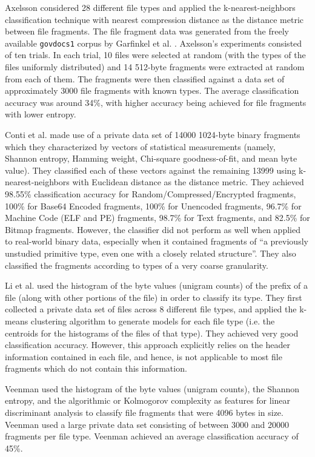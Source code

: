 \documentclass[letter,11pt]{article}
\begin{document}
Axelsson \cite{Axelsson10} considered 28 different file types and applied the k-nearest-neighbors classification technique with nearest compression distance as the distance metric between file fragments. The file fragment data was generated from the freely available \texttt{govdocs1} corpus by Garfinkel et al. \cite{Garfinkel09}. Axelsson's experiments consisted of ten trials. In each trial, 10 files were selected at random (with the types of the files uniformly distributed) and 14 512-byte fragments were extracted at random from each of them. The fragments were then classified against a data set of approximately 3000 file fragments with known types. The average classification accuracy was around 34\%, with higher accuracy being achieved for file fragments with lower entropy.

Conti et al. \cite{Conti10} made use of a private data set of 14000 1024-byte binary fragments which they characterized by vectors of statistical measurements (namely, Shannon entropy, Hamming weight, Chi-square goodness-of-fit, and mean byte value). They classified each of these vectors against the remaining 13999 using k-nearest-neighbors with Euclidean distance as the distance metric. They achieved 98.55\% classification accuracy for Random/Compressed/Encrypted fragments, 100\% for Base64 Encoded fragments, 100\% for Unencoded fragments, 96.7\% for Machine Code (ELF and PE) fragments, 98.7\% for Text fragments, and 82.5\% for Bitmap fragments. However, the classifier did not perform as well when applied to real-world binary data, especially when it contained fragments of ``a previously unstudied primitive type, even one with a closely related structure''. They also classified the fragments according to types of a very coarse granularity.

Li et al. \cite{Li05} used the histogram of the byte values (unigram counts) of the prefix of a file (along with other portions of the file) in order to classify its type. They first collected a private data set of files across 8 different file types, and applied the k-means clustering algorithm to generate models for each file type (i.e. the centroids for the histograms of the files of that type). They achieved very good classification accuracy. However, this approach explicitly relies on the header information contained in each file, and hence, is not applicable to most file fragments which do not contain this information.

Veenman \cite{Veenman07} used the histogram of the byte values (unigram counts), the Shannon entropy, and the algorithmic or Kolmogorov complexity \cite{Kolmogorov65, Lempel76} as features for linear discriminant analysis to classify file fragments that were 4096 bytes in size. Veenman used a large private data set consisting of between 3000 and 20000 fragments per file type. Veenman achieved an average classification accuracy of 45\%.
\end{document}
